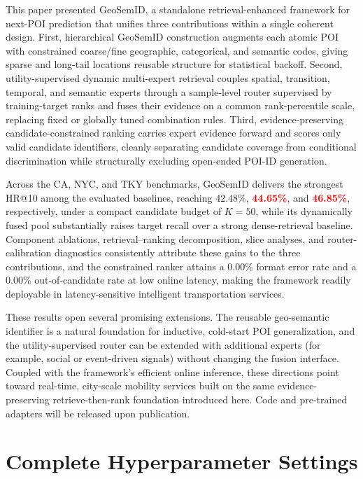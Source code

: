\documentclass[journal]{IEEEtran}
\newcommand{\mock}[1]{\textbf{\textcolor{red}{#1}}}
\begin{document}
This paper presented GeoSemID, a standalone retrieval-enhanced framework for
next-POI prediction that unifies three contributions within a single coherent
design. First, hierarchical GeoSemID construction augments each atomic POI with
constrained coarse/fine geographic, categorical, and semantic codes, giving
sparse and long-tail locations reusable structure for statistical backoff.
Second, utility-supervised dynamic multi-expert retrieval couples spatial,
transition, temporal, and semantic experts through a sample-level router
supervised by training-target ranks and fuses their evidence on a common
rank-percentile scale, replacing fixed or globally tuned combination rules.
Third, evidence-preserving candidate-constrained ranking carries expert evidence
forward and scores only valid candidate identifiers, cleanly separating
candidate coverage from conditional discrimination while structurally excluding
open-ended POI-ID generation.

Across the CA, NYC, and TKY benchmarks, GeoSemID delivers the strongest HR@10
among the evaluated baselines, reaching 42.48\%, \mock{44.65\%}, and
\mock{46.85\%}, respectively, under a compact candidate budget of $K=50$, while
its dynamically fused pool substantially raises target recall over a strong
dense-retrieval baseline. Component ablations, retrieval--ranking decomposition,
slice analyses, and router-calibration diagnostics consistently attribute these
gains to the three contributions, and the constrained ranker attains a 0.00\%
format error rate and a 0.00\% out-of-candidate rate at low online latency,
making the framework readily deployable in latency-sensitive intelligent
transportation services.

These results open several promising extensions. The reusable geo-semantic
identifier is a natural foundation for inductive, cold-start POI generalization,
and the utility-supervised router can be extended with additional experts (for
example, social or event-driven signals) without changing the fusion interface.
Coupled with the framework's efficient online inference, these directions point
toward real-time, city-scale mobility services built on the same
evidence-preserving retrieve-then-rank foundation introduced here.
Code and pre-trained adapters will be released upon publication.
\appendices

\section{Complete Hyperparameter Settings}
\label{app:hyperparams}
\end{document}
